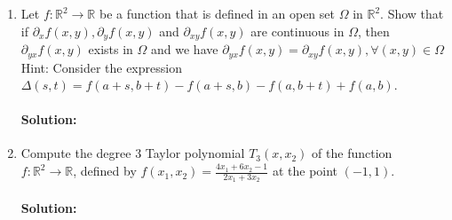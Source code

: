 \documentclass{article}
\begin{document}
\begin{enumerate}
\item Let $f : \mathbb{R}^2 \to \mathbb{R}$ be a function that is defined in an open set $\Omega$ in $\mathbb{R}^2$.  Show that if $\partial_x f(x,y), \partial_y f(x,y)$ and $\partial_{xy} f(x,y)$ are continuous in $\Omega$, then $\partial_{yx} f(x,y)$ exists in $\Omega$ and we have  $\partial_{yx} f(x,y) = \partial_{xy} f(x,y), \forall (x,y) \in \Omega$  Hint: Consider the expression $\Delta(s,t) = f(a+s,b+t) - f(a+s,b) - f(a,b+t) + f(a,b)$.  
    \paragraph{Solution: }

\item Compute the degree 3 Taylor polynomial $T_3(x,x_2)$ of the function $f: \mathbb{R}^2 \to \mathbb{R}$, defined by $f(x_1, x_2) = \frac{4x_1 + 6x_2 - 1}{2x_1 + 3x_2}$ at the point $(-1,1).$
    \paragraph{Solution: }
\end{enumerate}
\end{document}
